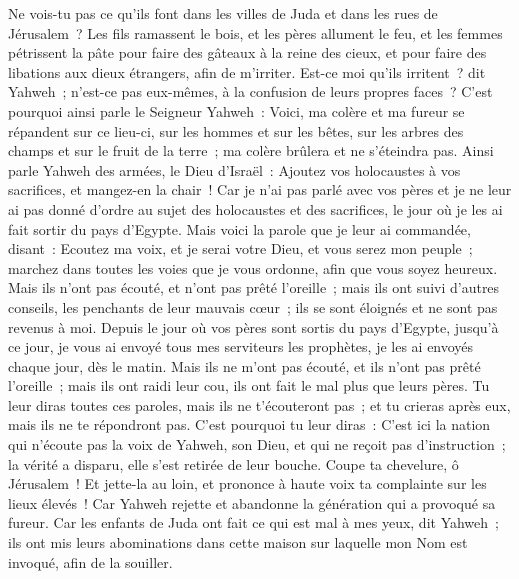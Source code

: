 \begin{multicols}{2}
Ne vois-tu pas ce qu'ils font dans les villes de Juda et dans les rues de Jérusalem~?
Les fils ramassent le bois, et les pères allument le feu, et les femmes pétrissent la pâte pour faire des gâteaux à la reine des cieux, et pour faire des libations aux dieux étrangers, afin de m'irriter.
Est-ce moi qu'ils irritent~? dit Yahweh~; n'est-ce pas eux-mêmes, à la confusion de leurs propres faces~?
C'est pourquoi ainsi parle le Seigneur Yahweh~: Voici, ma colère et ma fureur se répandent sur ce lieu-ci, sur les hommes et sur les bêtes, sur les arbres des champs et sur le fruit de la terre~; ma colère brûlera et ne s'éteindra pas.
Ainsi parle Yahweh des armées, le Dieu d'Israël~: Ajoutez vos holocaustes à vos sacrifices, et mangez-en la chair~!
Car je n'ai pas parlé avec vos pères et je ne leur ai pas donné d'ordre au sujet des holocaustes et des sacrifices, le jour où je les ai fait sortir du pays d'Egypte.
Mais voici la parole que je leur ai commandée, disant~: Ecoutez ma voix, et je serai votre Dieu, et vous serez mon peuple~; marchez dans toutes les voies que je vous ordonne, afin que vous soyez heureux.
Mais ils n'ont pas écouté, et n'ont pas prêté l'oreille~; mais ils ont suivi d'autres conseils, les penchants de leur mauvais cœur~; ils se sont éloignés et ne sont pas revenus à moi.
Depuis le jour où vos pères sont sortis du pays d'Egypte, jusqu'à ce jour, je vous ai envoyé tous mes serviteurs les prophètes, je les ai envoyés chaque jour, dès le matin.
Mais ils ne m'ont pas écouté, et ils n'ont pas prêté l'oreille~; mais ils ont raidi leur cou, ils ont fait le mal plus que leurs pères.
Tu leur diras toutes ces paroles, mais ils ne t'écouteront pas~; et tu crieras après eux, mais ils ne te répondront pas.
C'est pourquoi tu leur diras~: C'est ici la nation qui n'écoute pas la voix de Yahweh, son Dieu, et qui ne reçoit pas d'instruction~; la vérité a disparu, elle s'est retirée de leur bouche.
Coupe ta chevelure, ô Jérusalem~! Et jette-la au loin, et prononce à haute voix ta complainte sur les lieux élevés~! Car Yahweh rejette et abandonne la génération qui a provoqué sa fureur.
Car les enfants de Juda ont fait ce qui est mal à mes yeux, dit Yahweh~; ils ont mis leurs abominations dans cette maison sur laquelle mon Nom est invoqué, afin de la souiller.

\end{multicols}

